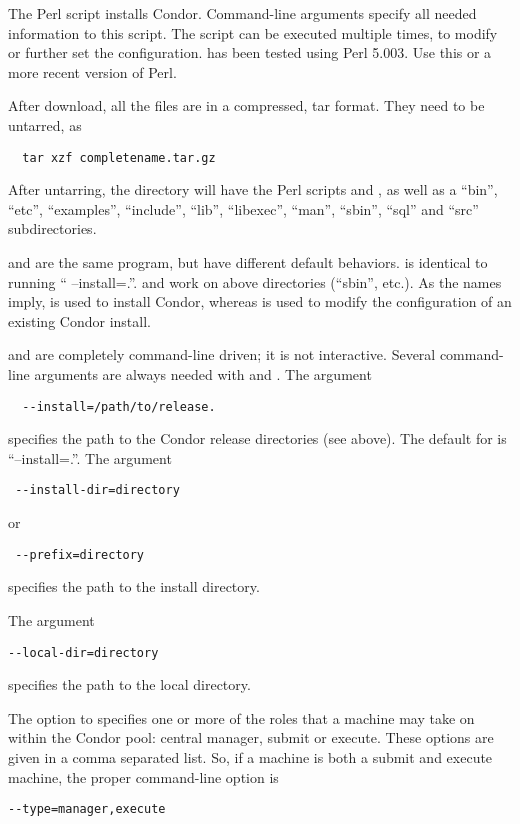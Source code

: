 The Perl script  installs Condor.
Command-line arguments specify all needed information to this
script.  The script can be executed multiple times, to modify or further
set the configuration.   has been tested using Perl 5.003.
Use this or a more recent version of Perl.

After download, all the files are in a compressed, tar format.
They need to be untarred, as
\begin{verbatim}
  tar xzf completename.tar.gz
\end{verbatim}
After untarring, the directory will have the Perl scripts
 and , as well as a ``bin'', ``etc'',
``examples'', ``include'', ``lib'', ``libexec'', ``man'', ``sbin'',
``sql'' and ``src'' subdirectories.

 and  are the same program, but have
different default behaviors.   is identical to
running `` --install=.''.
 and  work on above directories
(``sbin'', etc.).  As the names imply,  is used to
install Condor, whereas  is used to modify the
configuration of an existing Condor install.

 and  are completely command-line
driven; it is not interactive.  Several command-line arguments are
always needed with  and .
The argument
\begin{verbatim}
  --install=/path/to/release.
\end{verbatim}
specifies the path to the Condor release directories (see above).
The default for  is ``--install=.''.
The argument
\begin{verbatim} --install-dir=directory \end{verbatim}
or
\begin{verbatim} --prefix=directory \end{verbatim}
specifies the path to the install directory.

The argument
\begin{verbatim}
--local-dir=directory
\end{verbatim}
specifies the path to the local directory.

The  option to 
specifies one or more of the roles that a machine may take on
within the Condor pool: central manager, submit or execute.
These options are given in a comma separated list.
So, if a machine is both a submit and execute
machine, 
the proper command-line option is
\begin{verbatim}
--type=manager,execute
\end{verbatim}

